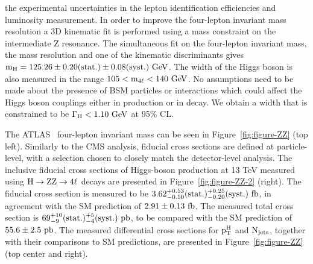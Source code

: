 \documentclass[10pt]{article}
\begin{document}
the experimental uncertainties in the lepton identification efficiencies and
luminosity measurement. In order to improve the four-lepton invariant mass
resolution a 3D kinematic fit is performed using a mass constraint on the
intermediate Z resonance. The simultaneous fit on the four-lepton
invariant mass, the mass resolution and one of the kinematic discriminants
gives ${\rm m_{H} = 125.26 \pm 0.20(stat.) \pm 0.08(syst.)~GeV}$. The width of
the Higgs boson is also measured in the range ${\rm 105 < m_{4\ell} < 140~GeV}$.
No assumptions need to be made about the presence of BSM particles or
interactions which could affect the Higgs boson couplings either in production
or in decay. We obtain a width that is constrained to be
${\rm \Gamma_{H} < 1.10~GeV}$ at 95\% CL.

The ATLAS~\cite{ATLAS-ZZ} four-lepton invariant mass can be seen in
Figure~\ref{fig:figure-ZZ} (top left). Similarly to the CMS analysis, fiducial
cross sections are defined at particle-level, with a selection chosen
to closely match the detector-level analysis. The inclusive fiducial cross
sections of Higgs-boson production at 13 TeV measured using
${\rm H \to ZZ \to 4\ell}$ decays are presented in Figure~\ref{fig:figure-ZZ-2}
(right). The fiducial cross section is measured
to be ${\rm 3.62_{-0.50}^{+0.53}(stat.)_{-0.20}^{+0.25}(syst.)~fb}$, in agreement
with the SM prediction of ${\rm 2.91 \pm 0.13~fb}$. The measured total cross section is
${\rm 69_{-9}^{+10}(stat.)_{-4}^{+5}(syst.)~pb}$, to be compared with the
SM prediction of ${\rm 55.6 \pm 2.5~pb}$. The measured differential cross sections
for ${\rm p_T^{H}}$ and ${\rm N_{jets}}$, together with their comparisons to SM
predictions, are presented in Figure~\ref{fig:figure-ZZ} (top center and right).
\end{document}
